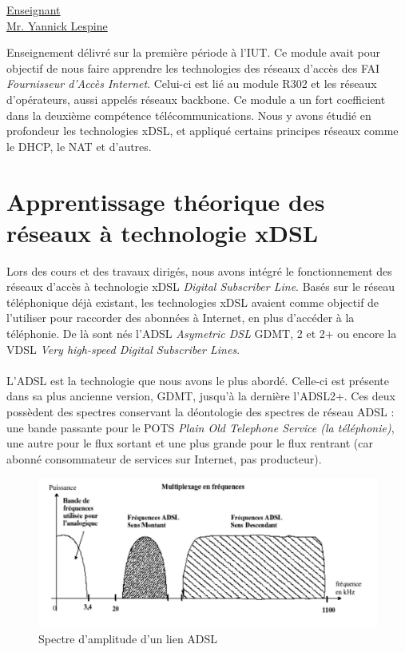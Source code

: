 \renewcommand{\figurename}{}

\vspace*{0.2cm}
      \large
      \href{\@orientadorPagina}{\color{black}Enseignant\\Mr. Yannick Lespine}\\
\vspace*{0.5cm}

Enseignement délivré sur la première période à l'IUT. Ce module avait pour objectif de nous faire apprendre les technologies des réseaux d'accès des FAI \textit{Fournisseur d'Accès Internet}. Celui-ci est lié au module R302 et les réseaux d'opérateurs, aussi appelés réseaux backbone. Ce module a un fort coefficient dans la deuxième compétence télécommunications. Nous y avons étudié en profondeur les technologies xDSL, et appliqué certains principes réseaux comme le DHCP, le NAT et d'autres.

\section{Apprentissage théorique des réseaux à technologie xDSL}

Lors des cours et des travaux dirigés, nous avons intégré le fonctionnement des réseaux d'accès à technologie xDSL \textit{Digital Subscriber Line}. Basés sur le réseau téléphonique déjà existant, les technologies xDSL avaient comme objectif de l'utiliser pour raccorder des abonnées à Internet, en plus d'accéder à la téléphonie. De là sont nés l'ADSL \textit{Asymetric DSL} GDMT, 2 et 2+ ou encore la VDSL \textit{Very high-speed Digital Subscriber Lines}.
\\ \\
L'ADSL est la technologie que nous avons le plus abordé. Celle-ci est présente dans sa plus ancienne version, GDMT, jusqu'à la dernière l'ADSL2+. Ces deux possèdent des spectres conservant la déontologie des spectres de réseau ADSL : une bande passante pour le POTS \textit{Plain Old Telephone Service (la téléphonie)}, une autre pour le flux sortant et une plus grande pour le flux rentrant (car abonné consommateur de services sur Internet, pas producteur).

\begin{figure}[h]
    \centering
    \includegraphics[width=1\linewidth]{imgs/tmp_adsl.jpg}
    \caption{Spectre d'amplitude d'un lien ADSL}
    \label{fig:tmp_adsl}
\end{figure}


